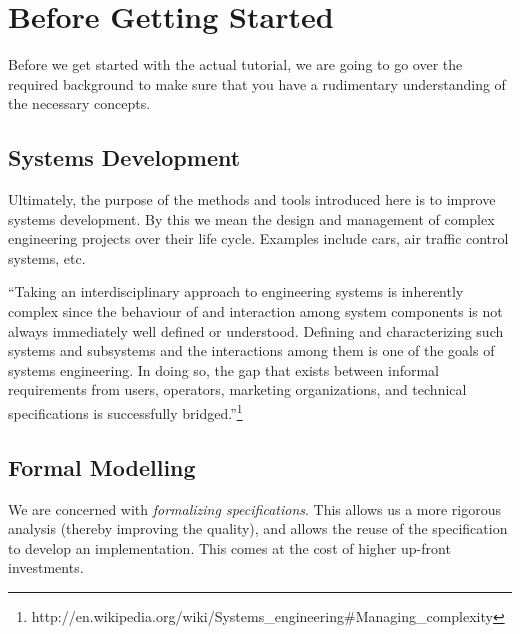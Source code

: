 \section{Before Getting Started}
\label{tutorial_01}

Before we get started with the actual tutorial, we are going to go over the required background to make sure that you have a rudimentary understanding of the necessary concepts.


\subsection{Systems Development}

Ultimately, the purpose of the methods and tools introduced here is to improve systems development.  By this we mean the design and management of complex engineering projects over their life cycle.  Examples include cars, air traffic control systems, etc.

``Taking an interdisciplinary approach to engineering systems is inherently complex since the behaviour of and interaction among system components is not always immediately well defined or understood. Defining and characterizing such systems and subsystems and the interactions among them is one of the goals of systems engineering. In doing so, the gap that exists between informal requirements from users, operators, marketing organizations, and technical specifications is successfully bridged.''\footnote{http://en.wikipedia.org/wiki/Systems\_engineering\#Managing\_complexity}

\subsection{Formal Modelling}

We are concerned with \textit{formalizing specifications}.  This allows us a more rigorous analysis (thereby improving the quality), and allows the reuse of the specification to develop an implementation.  This comes at the cost of higher up-front investments.

